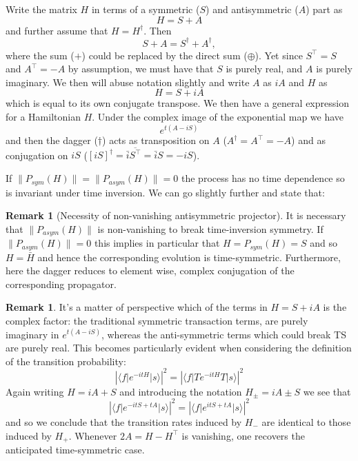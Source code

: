 \documentclass[aps,pra,12pt,nofootinbib,superscriptaddress,longbibliography,showpacs]{revtex4-1}
\theoremstyle{plain}
\theoremstyle{definition}
\newtheorem{remark}[theorem]{Remark}
\newcommand{\bra}[1]{\mbox{$\langle #1|$}}
\newcommand{\ket}[1]{\ensuremath{|#1\rangle}}
\begin{document}
Write the matrix $H$ in terms of a symmetric ($S$) and antisymmetric ($A$) part as 
$$ 
H = S + A
$$ 
and further assume that $H = H^\dagger$.  Then 
$$ 
S + A = S^\dagger + A^\dagger, 
$$ 
where the sum ($+$) could be replaced by the direct sum ($\oplus$). 
Yet since $S^\top = S$ and $A^\top = - A$ by assumption, we must have that $S$ is purely real, and $A$ is purely imaginary.  
We then will abuse notation slightly and write $A$ as $iA$ and $H$ as 
$$ 
H = S + i A
$$ 
which is equal to its own conjugate transpose.  We then have a general expression for a Hamiltonian $H$.  Under the complex image of the exponential map we have 
$$ 
e^{t(A-iS)} 
$$ 
and then the dagger ($\dagger$) acts as transposition on $A$ ($A^\dagger =
A^\top = - A$) and as conjugation on $iS$ ($[iS]^\dagger =
\bar{i}\overline{S^\top} = \bar{i}S = - iS$). 

If $\| P_{sym}(H)\| = \| P_{asym}(H)\|=0$ the
process has no time dependence so is invariant under time inversion. We can go
slightly further and state that: 

\begin{remark}[Necessity of non-vanishing antisymmetric projector]
It is necessary that $\| P_{asym}(H)\|$ is non-vanishing to
break time-inversion symmetry.  If $\| P_{asym}(H)\| = 0$ this
implies in particular that $H = P_{sym}(H) = S$ and so $H = \bar H$ and hence
the corresponding evolution is time-symmetric.  Furthermore, here the dagger
reduces to element wise, complex conjugation of the corresponding propagator.  
\end{remark}




\begin{remark} 
It's a matter of perspective which of the terms in $H=S+iA$ is the complex factor: the traditional symmetric transaction terms, are purely imaginary in $e^{t(A-iS)}$, whereas the anti-symmetric terms which could break TS are purely real.  This becomes particularly evident when considering the definition of the transition probability: 
$$ 
|\bra{f}e^{-itH}\ket{s}|^2 = |\bra{f}Te^{-itH}T\ket{s}|^2
$$ 
Again writing $H = iA + S$ and introducing the notation $H_\pm = iA \pm S$ we see that 
$$ 
|\bra{f}e^{-itS+tA}\ket{s}|^2 = |\bra{f}e^{itS+tA}\ket{s}|^2
$$ 
and so we conclude that the transition rates induced by $H_-$ are identical to those induced by $H_+$.  Whenever $2A=H-H^\top$ is vanishing, one recovers the anticipated time-symmetric case. 
\end{remark} 

\end{document}

